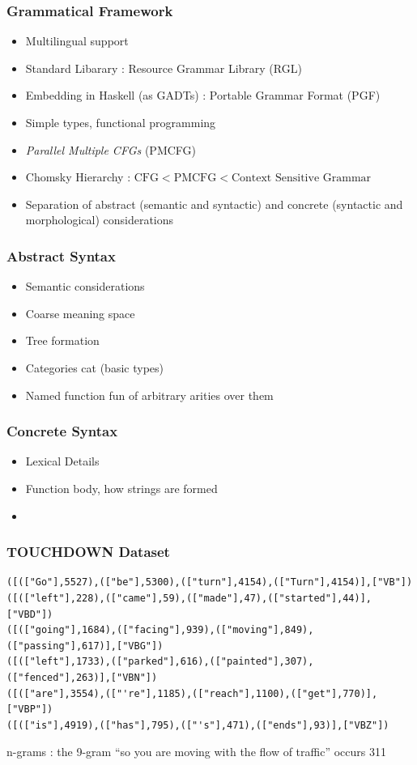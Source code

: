 \documentclass{beamer}
\begin{document}
\begin{frame}
\frametitle{Grammatical Framework}
\begin{itemize}[<+->]
\item Multilingual support
\item Standard Libarary : Resource Grammar Library (RGL)
\item Embedding in Haskell (as GADTs) : Portable Grammar Format (PGF)
\item Simple types, functional programming
\item \emph{Parallel Multiple CFGs} (PMCFG)
\item Chomsky Hierarchy : $\text{CFG} < \text{PMCFG} < \text{Context Sensitive Grammar}$
\item Separation of abstract (semantic and syntactic) and concrete (syntactic and
 morphological) considerations
\end{itemize}
\end{frame}

\begin{frame}
\frametitle{Abstract Syntax}
\begin{itemize}[<+->]
\item Semantic considerations
\item Coarse meaning space
\item Tree formation
\item Categories cat (basic types)
\item Named function fun of arbitrary arities over them
\end{itemize}
\end{frame}

\begin{frame}
\frametitle{Concrete Syntax}
\begin{itemize}[<+->]
\item Lexical Details
\item Function body, how strings are formed
\item 
\end{itemize}
\end{frame}

\begin{frame}[fragile]
\frametitle{TOUCHDOWN Dataset}
\fontsize{9pt}{10pt}\selectfont

\begin{verbatim}
([(["Go"],5527),(["be"],5300),(["turn"],4154),(["Turn"],4154)],["VB"])
([(["left"],228),(["came"],59),(["made"],47),(["started"],44)],["VBD"])
([(["going"],1684),(["facing"],939),(["moving"],849),(["passing"],617)],["VBG"])
([(["left"],1733),(["parked"],616),(["painted"],307),(["fenced"],263)],["VBN"])
([(["are"],3554),(["'re"],1185),(["reach"],1100),(["get"],770)],["VBP"])
([(["is"],4919),(["has"],795),(["'s"],471),(["ends"],93)],["VBZ"])
\end{verbatim}

n-grams : the 9-gram ``so you are moving with the flow of traffic'' occurs 311

\end{frame}
\end{document}
